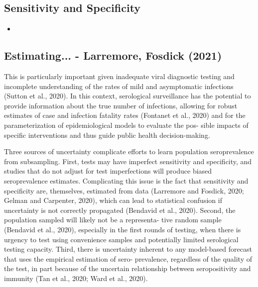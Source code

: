 \documentclass[11pt,notitlepage,twoside]{article}
\begin{document}
\subsection{Sensitivity and Specificity}
\begin{itemize}
\item 
\end{itemize}

\subsection{Estimating... - Larremore, Fosdick (2021)}
This is particularly important given inadequate viral diagnostic testing and incomplete understanding of the rates of mild and asymptomatic infections (Sutton et al., 2020). In this context, serological surveillance has the potential to provide information about the true number of infections, allowing for robust estimates of case and infection fatality rates (Fontanet et al., 2020) and for the parameterization of epidemiological models to evaluate the pos- sible impacts of specific interventions and thus guide public health decision-making.

Three sources of uncertainty complicate efforts to learn population seroprevalence from subsampling. First, tests may have imperfect sensitivity and specificity, and studies that do not adjust for test imperfections will produce biased seroprevalence estimates. Complicating this issue is the fact that sensitivity and specificity are, themselves, estimated from data (Larremore and Fosdick, 2020; Gelman and Carpenter, 2020), which can lead to statistical confusion if uncertainty is not correctly propagated (Bendavid et al., 2020). Second, the population sampled will likely not be a representa- tive random sample (Bendavid et al., 2020), especially in the first rounds of testing, when there is urgency to test using convenience samples and potentially limited serological testing capacity. Third, there is uncertainty inherent to any model-based forecast that uses the empirical estimation of sero- prevalence, regardless of the quality of the test, in part because of the uncertain relationship between seropositivity and immunity (Tan et al., 2020; Ward et al., 2020).
\end{document}
